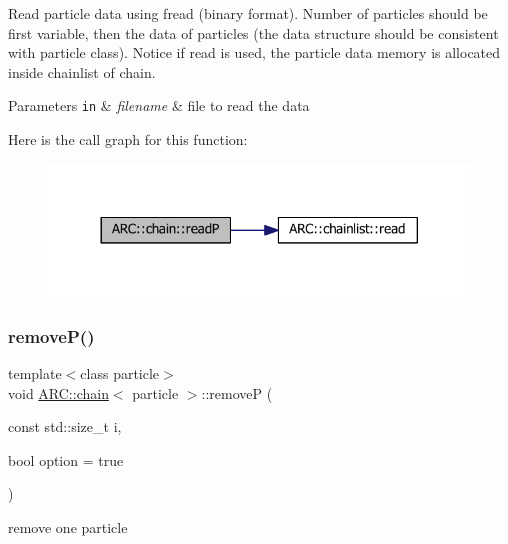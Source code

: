 Read particle data using fread (binary format). Number of particles should be first variable, then the data of particles (the data structure should be consistent with particle class). Notice if read is used, the particle data memory is allocated inside chainlist of chain. 
\begin{DoxyParams}[1]{Parameters}
\mbox{\tt in}  & {\em filename} & file to read the data \\
\hline
\end{DoxyParams}
Here is the call graph for this function\+:
\nopagebreak
\begin{figure}[H]
\begin{center}
\leavevmode
\includegraphics[width=317pt]{classARC_1_1chain_ad2e17ce21d086e8852951cf31568cf76_cgraph}
\end{center}
\end{figure}
\hypertarget{classARC_1_1chain_a6c622f6f09a11f81a72e26de0c8cbfc8}{}\label{classARC_1_1chain_a6c622f6f09a11f81a72e26de0c8cbfc8} 
\subsubsection{\texorpdfstring{remove\+P()}{removeP()}}
{\footnotesize\ttfamily template$<$class particle$>$ \\
void \hyperlink{classARC_1_1chain}{A\+R\+C\+::chain}$<$ particle $>$\+::removeP (\begin{DoxyParamCaption}\item[{const std\+::size\+\_\+t}]{i,  }\item[{bool}]{option = {\ttfamily true} }\end{DoxyParamCaption})\hspace{0.3cm}{\ttfamily [inline]}}



remove one particle 

